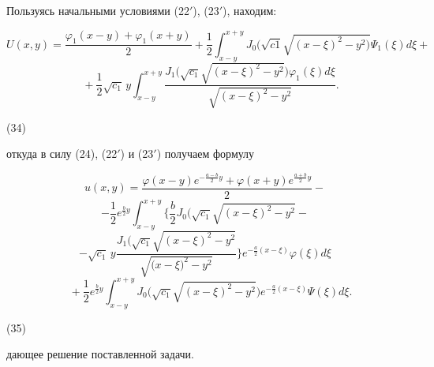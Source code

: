 \documentclass{article}
\begin{document}
Пользуясь начальными условиями (22$'$), (23$'$), находим:


\[U(x, y) = \frac{\varphi_1(x - y) + \varphi_1(x + y)}{2} + \frac{1}{2}\int_{x-y}^{x+y} J_0 \big( \sqrt{c1} \sqrt{(x - \xi)^2 - y^2 \big)}  \Psi_1(\xi) d\xi+ \]
\[\quad + \frac{1}{2} \sqrt{c_1}\, y \int_{x-y}^{x+y} \frac{J_1 ( \sqrt{c_1} \sqrt{(x - \xi)^2 - y^2} \big) \varphi_1(\xi)d\xi}{\sqrt{(x - \xi)^2 - y^2}}.\]
\begin{flushright}
    (34)
\end{flushright}

откуда в силу (24), (22$'$) и (23$'$) получаем формулу

\[u(x, y) = \frac{\varphi(x - y) e^{-\frac{a - b}{2} y} + \varphi(x + y) e^{\frac{a + b}{2} y}}{2}- \]
\[ - \frac{1}{2} e^{\frac{b}{2} y}  \int_{x-y}^{x+y} \bigg\{ \frac{b}{2} J_0 (\sqrt{c_1} \sqrt{(x - \xi)^2 - y^2} - \]
\[ - \sqrt{c_1}\, y \frac{J_1 \big( \sqrt{c_1} \sqrt{(x - \xi)^2 - y^2}}{\sqrt{\big(x - \xi)^2 - y^2}} \bigg\} e^{-\frac{a}{2} (x - \xi)}\varphi(\xi) d\xi \]
\[\quad + \frac{1}{2} e^{\frac{b}{2} y} 
\int_{x-y}^{x+y} J_0 ( \sqrt{c_1} \sqrt{(x - \xi)^2 - y^2} \big) e^{-\frac{a}{2} (x - \xi)} \Psi(\xi) d\xi.\]
\begin{flushright}
    (35)
\end{flushright}


дающее решение поставленной задачи.
\end{document}
